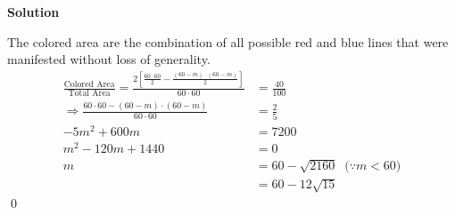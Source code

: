 \documentclass{article}
\newenvironment{solution}{\begin{trivlist}\item[]{\bf Solution}}{\qed \end{trivlist}}
\begin{document}
\begin{solution}
\begin{center}
\end{center}
The colored area are the combination of all possible red and blue lines that were manifested without loss of generality. 
\begin{align*}
\frac{\text{Colored Area}}{\text{Total Area}}
=\frac{2\left[\frac{60\cdot60}{2}-\frac{(60-m)\cdot(60-m)}{2}\right]}{60\cdot60}&=\frac{40}{100} \\
\Rightarrow \frac{60\cdot60-(60-m)\cdot(60-m)}{60\cdot60}&=\frac{2}{5} \\
-5m^2+600m&=7200 \\
m^2-120m+1440&=0 \\
m&=60-\sqrt{2160} \ \text{ ($\because m<60$)} \\
&=\boxed{60-12\sqrt{15}}
\end{align*}
\end{solution}

\newpage
\end{document}
